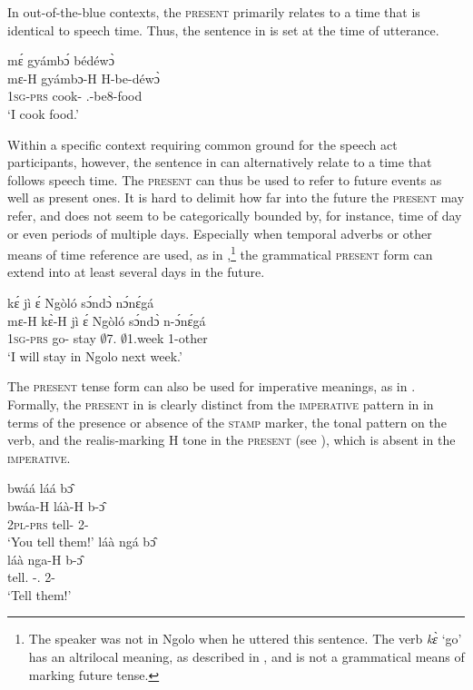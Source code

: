 In out-of-the-blue contexts, the \textsc{present} primarily relates to a time that is identical to speech time. Thus, the sentence in  is set at the time of utterance.


\ea\label{PRES1}
  \glll  mɛ́ gyámbɔ́ bédéwɔ̀ \\
         mɛ-H gyámbɔ-H H-be-déwɔ̀ \\
            1\textsc{sg}-\textsc{prs} cook-{\R} {\OBJ}.{\LINK}-be8-food\\
    \trans `I cook food.'
\z

\noindent Within a specific context requiring common ground for the speech act participants, however, the sentence in  can alternatively relate to a time that follows speech time. The \textsc{present} can thus be used to refer to future events as well as present ones. It is hard to delimit how far into the future the \textsc{present} may refer, and does not seem to be categorically bounded by, for instance, time of day or even periods of multiple days. Especially when temporal adverbs or other means of time reference are used, as in ,\footnote{The speaker was not in Ngolo when he uttered this sentence. The verb {\itshape kɛ̀} `go' has an  altrilocal meaning, as described in , and is not a grammatical means of marking future tense.} the grammatical \textsc{present} form can extend into at least several days in the future.

\ea\label{presfut}
   kɛ́ jì ɛ́ Ngòló sɔ́ndɔ̀ nɔ́nɛ́gá \\
         mɛ-H kɛ̀-H jì ɛ́ Ngòló sɔ́ndɔ̀ n-ɔ́nɛ́gá \\
          1\textsc{sg}-\textsc{prs} go-{\R} stay {\LOC} $\emptyset$7.{\PN} $\emptyset$1.week 1-other\\
    \trans `I will stay in Ngolo next week.'
\z


The \textsc{present} tense form can also be used for imperative meanings, as in .
Formally, the \textsc{present} in  is clearly distinct from the \textsc{imperative} pattern in  in terms of the presence or absence of the \textsc{stamp} marker, the tonal pattern on the verb, and the realis-marking H tone in the \textsc{present} (see ), which is absent in the \textsc{imperative}. 

\ea\label{presimp}
\ea \label{presimp1}
  \glll  bwáá láá bɔ̂  \\
         bwáa-H láà-H b-ɔ̂ \\
            2\textsc{pl}-\textsc{prs} tell-{\R} 2-{\OBJ}     \\
    \trans `You tell them!'
\ex\label{presimp2}
  \glll  láà ngá bɔ̂ \\
         láà nga-H b-ɔ̂ \\
           tell.{\IMP} {\PL}-{\OBJ}.{\LINK} 2-{\OBJ}     \\
    \trans `Tell them!'
\z
\z



